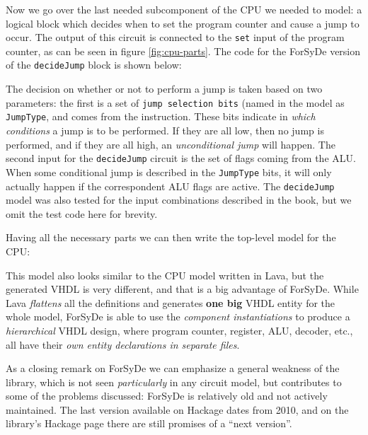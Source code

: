 \documentclass[a4paper]{article}
\begin{document}
                Now we go over the last needed subcomponent of the CPU we needed to model: a logical
                block which decides when to set the program counter and cause a jump to occur. The
                output of this circuit is connected to the \texttt{set} input of the program
                counter, as can be seen in figure \ref{fig:cpu-parts}. The code for the ForSyDe
                version of the \texttt{decideJump} block is shown below:


                The decision on whether or not to perform a jump is taken based on two parameters:
                the first is a set of \texttt{jump selection bits} (named in the model as
                \texttt{JumpType}, and comes from the instruction. These bits indicate in
                \emph{which conditions} a jump is to be performed. If they are all low, then no jump
                is performed, and if they are all high, an \emph{unconditional jump} will happen.
                The second input for the \texttt{decideJump} circuit is the set of flags coming from
                the ALU. When some conditional jump is described in the \texttt{JumpType} bits, it
                will only actually happen if the correspondent ALU flags are active. The
                \texttt{decideJump} model was also tested for the input combinations described in
                the book\cite{nand2tetris-book}, but we omit the test code here for brevity.

                Having all the necessary parts we can then write the top-level model for the CPU:


                This model also looks similar to the CPU model written in Lava, but the generated
                VHDL is very different, and that is a big advantage of ForSyDe. While Lava
                \emph{flattens} all the definitions and generates \textbf{one big} VHDL entity for
                the whole model, ForSyDe is able to use the \emph{component instantiations} to
                produce a \emph{hierarchical} VHDL design, where program counter, register, ALU,
                decoder, etc., all have their \emph{own entity declarations in separate files}.

                As a closing remark on ForSyDe we can emphasize a general weakness of the library,
                which is not seen \emph{particularly} in any circuit model, but contributes to
                some of the problems discussed: ForSyDe is relatively old and not actively
                maintained. The last version available on Hackage\cite{forsyde-3.1.1-hackage} dates
                from 2010, and on the library's Hackage page there are still promises of a ``next
                version''.
\end{document}
